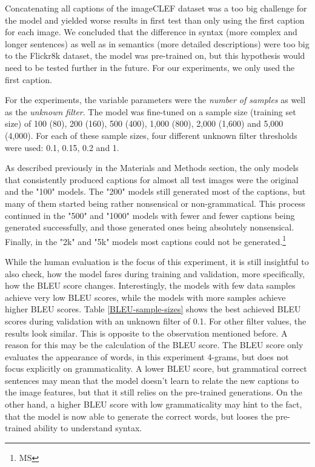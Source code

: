\documentclass[11pt]{article}
\begin{document}
Concatenating all captions of the imageCLEF dataset was a too big challenge for the model and yielded worse results in first test than only using the first caption for each image. We concluded that the difference in syntax (more complex and longer sentences) as well as in semantics (more detailed descriptions) were too big to the Flickr8k dataset, the model was pre-trained on, but this hypothesis would need to be tested further in the future. For our experiments, we only used the first caption.

For the experiments, the variable parameters were the \emph{number of samples} as well as the \emph{unknown filter}. The model was fine-tuned on a sample size (training set size) of 100 (80), 200 (160), 500 (400), 1,000 (800), 2,000 (1,600) and 5,000 (4,000). For each of these sample sizes, four different unknown filter thresholds were used: 0.1, 0.15, 0.2 and 1.

As described previously in the Materials and Methods section, the only models that consistently produced captions for almost all test images were the original and the "100" models. The "200" models still generated most of the captions, but many of them started being rather nonsensical or non-grammatical. This process continued in the "500" and "1000" models with fewer and fewer captions being generated successfully, and those generated ones being absolutely nonsensical. Finally, in the "2k" and "5k" models most captions could not be generated.\footnote{MS}

While the human evaluation is the focus of this experiment, it is still insightful to also check, how the model fares during training and validation, more specifically, how the BLEU score changes. Interestingly, the models with few data samples achieve very low BLEU scores, while the models with more samples achieve higher BLEU scores. Table \ref{BLEU-sample-sizes} shows the best achieved BLEU scores during validation with an unknown filter of 0.1. For other filter values, the results look similar. This is opposite to the observation mentioned before. A reason for this may be the calculation of the BLEU score. The BLEU score only evaluates the appearance of words, in this experiment 4-grams, but does not focus explicitly on grammaticality. A lower BLEU score, but grammatical correct sentences may mean that the model doesn't learn to relate the new captions to the image features, but that it still relies on the pre-trained generations. On the other hand, a higher BLEU score with low grammaticality may hint to the fact, that the model is now able to generate the correct words, but looses the pre-trained ability to understand syntax.
\end{document}
